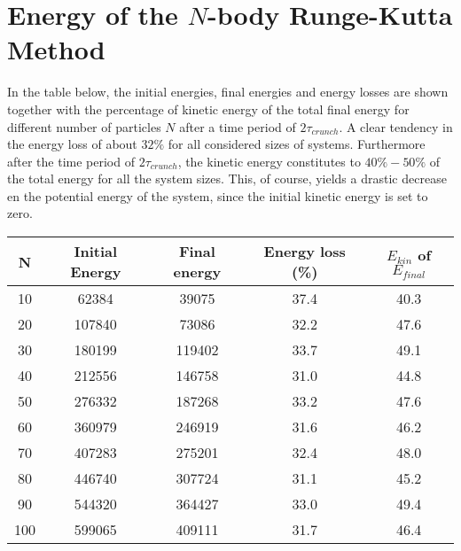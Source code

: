 \section{Energy of the $N$-body Runge-Kutta Method}
\label{sec:EnergyRK4}


In the table below, the initial energies, final energies and energy losses are shown together with the percentage of kinetic energy of the total final energy for different number of particles $N$ after a time period of $2\tau_{crunch}$. 
A clear tendency in the energy loss of about $32 \%$ for all considered sizes of systems. 
Furthermore after the time period of $2\tau_{crunch}$, the kinetic energy constitutes to $40 \% - 50\%$ of the total energy for all the system sizes. 
This, of course, yields a drastic decrease en the potential energy of the system, since the initial kinetic energy is set to zero. 


\begin{table}[H]
\centering
    \begin{tabular}{|c|c|c|c|c|}\hline
      	N & Initial Energy & Final energy & Energy loss (\%) & $E_{kin}$ of $E_{final}$  
      	\\ \hline
        10 & 62384 & 39075 & 37.4 & 40.3
        \\ \hline
        20 & 107840 & 73086 & 32.2 & 47.6
        \\ \hline
        30 & 180199 & 119402 & 33.7 & 49.1
        \\ \hline
        40 & 212556 & 146758 & 31.0 & 44.8
        \\ \hline
        50 & 276332 & 187268 & 33.2 & 47.6
        \\ \hline
        60 & 360979 & 246919 & 31.6 & 46.2
        \\ \hline
        70 & 407283 & 275201 & 32.4 & 48.0
        \\ \hline
        80 & 446740 & 307724 & 31.1 & 45.2
        \\ \hline
        90 & 544320 & 364427 & 33.0 & 49.4
        \\ \hline
        100 & 599065 & 409111 & 31.7 & 46.4
        \\ \hline
      \end{tabular}
      \label{EnergyRK4differentN}
\end{table}

